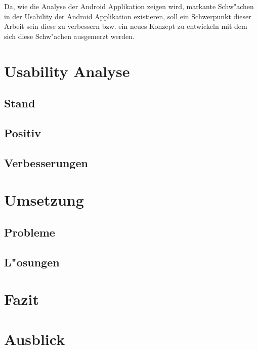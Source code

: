 \documentclass[12pt,a4paper,bibliography=totocnumbered,listof=totocnumbered]{scrartcl}
\begin{document}
Da, wie die Analyse der Android Applikation zeigen wird, markante Schw"achen in der Usability der Android Applikation existieren, soll ein Schwerpunkt dieser Arbeit sein diese zu verbessern bzw. ein neues Konzept zu entwickeln mit dem sich diese Schw"achen ausgemerzt werden.

\section{Usability Analyse}
\subsection{Stand}
\subsection{Positiv}
\subsection{Verbesserungen}

\section{Umsetzung}
\subsection{Probleme}
\subsection{L"osungen}

\section{Fazit}


\section{Ausblick}
\end{document}
